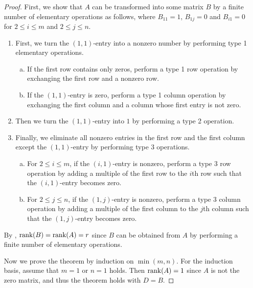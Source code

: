 \begin{proof}
  First, we show that $A$ can be transformed into some matrix $B$ by a finite
  number of elementary operations as follows, where $B_{11} = 1$, $B_{1j} = 0$
  and $B_{i1} = 0$ for $2 \leq i \leq m$ and $2 \leq j \leq n$.
  \begin{enumerate}[1.]
    \item First, we turn the $(1, 1)$-entry into a nonzero number by performing
    type 1 elementary operations.
    \begin{enumerate}[a.]
      \item If the first row contains only zeros, perform a type 1 row
      operation by exchanging the first row and a nonzero row.
      \item If the $(1, 1)$-entry is zero, perform a type 1 column
      operation by exchanging the first column and a column whose first entry
      is not zero.
    \end{enumerate}
    \item Then we turn the $(1, 1)$-entry into $1$ by performing a type 2
    operation.
    \item Finally, we eliminate all nonzero entries in the first row and the
    first column except the $(1, 1)$-entry by performing type 3 operations.
    \begin{enumerate}[a.]
      \item For $2 \leq i \leq m$, if the $(i, 1)$-entry is nonzero, perform a
      type 3 row operation by adding a multiple of the first row to the $i$th
      row such that the $(i, 1)$-entry becomes zero.
      \item For $2 \leq j \leq n$, if the $(1, j)$-entry is nonzero, perform a
      type 3 column operation by adding a multiple of the first column to the
      $j$th column such that the $(1, j)$-entry becomes zero.
    \end{enumerate}
  \end{enumerate}
  By , $\operatorname{rank}(B) = \operatorname{rank}(A) = r$ since $B$ can be
  obtained from $A$ by performing a finite number of elementary operations.

  Now we prove the theorem by induction on $\min(m, n)$.
  For the induction basis, assume that $m = 1$ or $n = 1$ holds.
  Then $\operatorname{rank}(A) = 1$ since $A$ is not the zero matrix, and thus the theorem
  holds with $D = B$.


\end{proof}
